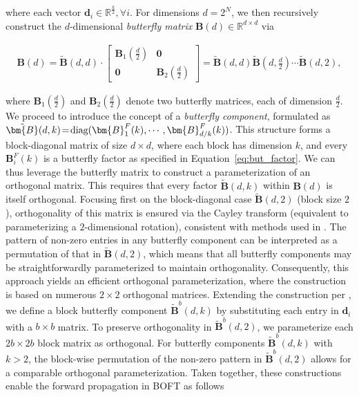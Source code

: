 where each vector $\bm{d}_i\in\mathbb{R}^{\frac{k}{2}},\forall i$. For dimensions $d=2^N$, we then recursively construct the $d$-dimensional \emph{butterfly matrix} $\bm{B}(d)\in\mathbb{R}^{d\times d}$ via

\begin{equation}
\begin{aligned}
    \!\!\bm{B}(d)=\tilde{\bm{B}}(d,d)\!\cdot\!\begin{bmatrix}
    \bm{B}_1(\frac{d}{2})\!\!\!\!\! & \bm{0} \\
    \bm{0}\!\!\!\!\! &\bm{B}_2(\frac{d}{2})
    \end{bmatrix}= \tilde{\bm{B}}(d,d)\tilde{\bm{B}}(d,\frac{d}{2})\cdots\tilde{\bm{B}}(d,2),
\end{aligned}
\end{equation}

where $\bm{B}_1(\frac{d}{2})$ and $\bm{B}_2(\frac{d}{2})$ denote two butterfly matrices, each of dimension $\frac{d}{2}$. We proceed to introduce the concept of a \emph{butterfly component}, formulated as $\thickmuskip=2mu \medmuskip=2mu \tilde{\bm{B}}(d,k)=\text{diag}(\bm{B}^F_1(k),\cdots,\bm{B}^F_{d/k}(k))$. This structure forms a block-diagonal matrix of size $d\times d$, where each block has dimension $k$, and every $\bm{B}^F_i(k)$ is a butterfly factor as specified in Equation~\ref{eq:but_factor}. We can thus leverage the butterfly matrix to construct a parameterization of an orthogonal matrix. This requires that every factor $\tilde{\bm{B}}(d,k)$ within $\bm{B}(d)$ is itself orthogonal. Focusing first on the block-diagonal case $\tilde{\bm{B}}(d,2)$ (block size $2$), orthogonality of this matrix is ensured via the Cayley transform (equivalent to parameterizing a $2$-dimensional rotation), consistent with methods used in \cite{liu2021orthogonal,qiu2023controlling}. The pattern of non-zero entries in any butterfly component can be interpreted as a permutation of that in $\tilde{\bm{B}}(d,2)$, which means that all butterfly components may be straightforwardly parameterized to maintain orthogonality. Consequently, this approach yields an efficient orthogonal parameterization, where the construction is based on numerous $2\times 2$ orthogonal matrices. Extending the construction per \cite{chen2022pixelated}, we define a block butterfly component $\tilde{\bm{B}}^b(d,k)$ by substituting each entry in $\bm{d}_i$ with a $b\times b$ matrix. To preserve orthogonality in $\tilde{\bm{B}}^b(d,2)$, we parameterize each $2b\times 2b$ block matrix as orthogonal. For butterfly components $\tilde{\bm{B}}^b(d,k)$ with $k>2$, the block-wise permutation of the non-zero pattern in $\tilde{\bm{B}}^b(d,2)$ allows for a comparable orthogonal parameterization. Taken together, these constructions enable the forward propagation in BOFT as follows

